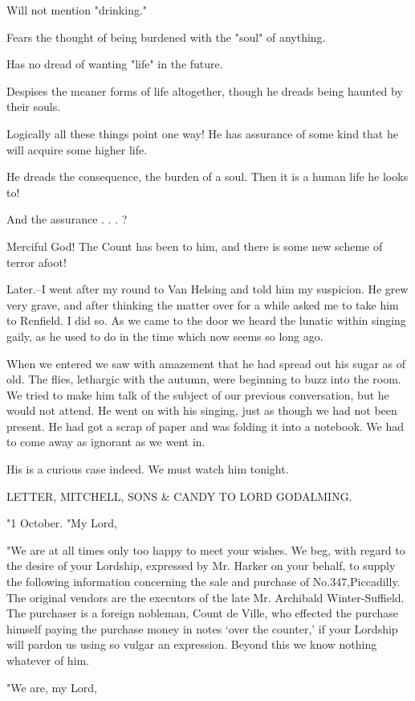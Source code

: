 Will not mention "drinking." 

Fears the thought of being burdened with the "soul" of anything. 

Has no dread of wanting "life" in the future. 

Despises the meaner forms of life altogether, though he dreads being haunted by their souls. 

Logically all these things point one way! He has assurance of some kind that he will acquire some higher life. 

He dreads the consequence, the burden of a soul. Then it is a human life he looks to! 

And the assurance . . . ? 

Merciful God! The Count has been to him, and there is some new scheme of terror afoot! 

Later.--I went after my round to Van Helsing and told him my suspicion. He grew very grave, and after thinking the matter over for a while asked me to take him to Renfield. I did so. As we came to the door we heard the lunatic within singing gaily, as he used to do in the time which now seems so long ago. 

When we entered we saw with amazement that he had spread out his sugar as of old. The flies, lethargic with the autumn, were beginning to buzz into the room. We tried to make him talk of the subject of our previous conversation, but he would not attend. He went on with his singing, just as though we had not been present. He had got a scrap of paper and was folding it into a notebook. We had to come away as ignorant as we went in. 

His is a curious case indeed. We must watch him tonight. 

LETTER, MITCHELL, SONS \& CANDY TO LORD GODALMING. 

"1 October. "My Lord, 

"We are at all times only too happy to meet your wishes. We beg, with regard to the desire of your Lordship, expressed by Mr. Harker on your behalf, to supply the following information concerning the sale and purchase of No.347,Piccadilly. The original vendors are the executors of the late Mr. Archibald Winter-Suffield. The purchaser is a foreign nobleman, Count de Ville, who effected the purchase himself paying the purchase money in notes `over the counter,' if your Lordship will pardon us using so vulgar an expression. Beyond this we know nothing whatever of him. 

"We are, my Lord, 


